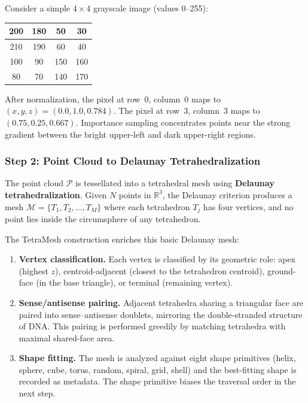\begin{example}
Consider a simple $4 \times 4$ grayscale image (values 0--255):
\begin{center}
\begin{tabular}{|c|c|c|c|}
\hline
200 & 180 & 50 & 30 \\
\hline
210 & 190 & 60 & 40 \\
\hline
100 & 90 & 150 & 160 \\
\hline
80 & 70 & 140 & 170 \\
\hline
\end{tabular}
\end{center}
After normalization, the pixel at row~0, column~0 maps to $(x, y, z) = (0.0, 1.0, 0.784)$. The pixel at row~3, column~3 maps to $(0.75, 0.25, 0.667)$. Importance sampling concentrates points near the strong gradient between the bright upper-left and dark upper-right regions.
\end{example}

\subsubsection{Step 2: Point Cloud to Delaunay Tetrahedralization}

The point cloud $\mathcal{P}$ is tessellated into a tetrahedral mesh using \textbf{Delaunay tetrahedralization}. Given $N$ points in $\mathbb{R}^3$, the Delaunay criterion produces a mesh $\mathcal{M} = \{T_1, T_2, \ldots, T_M\}$ where each tetrahedron $T_j$ has four vertices, and no point lies inside the circumsphere of any tetrahedron.

The TetraMesh construction enriches this basic Delaunay mesh:
\begin{enumerate}[leftmargin=1.8em]
  \item \textbf{Vertex classification.} Each vertex is classified by its geometric role: apex (highest $z$), centroid-adjacent (closest to the tetrahedron centroid), ground-face (in the base triangle), or terminal (remaining vertex).
  \item \textbf{Sense/antisense pairing.} Adjacent tetrahedra sharing a triangular face are paired into sense--antisense doublets, mirroring the double-stranded structure of DNA. This pairing is performed greedily by matching tetrahedra with maximal shared-face area.
  \item \textbf{Shape fitting.} The mesh is analyzed against eight shape primitives (helix, sphere, cube, torus, random, spiral, grid, shell) and the best-fitting shape is recorded as metadata. The shape primitive biases the traversal order in the next step.
\end{enumerate}

